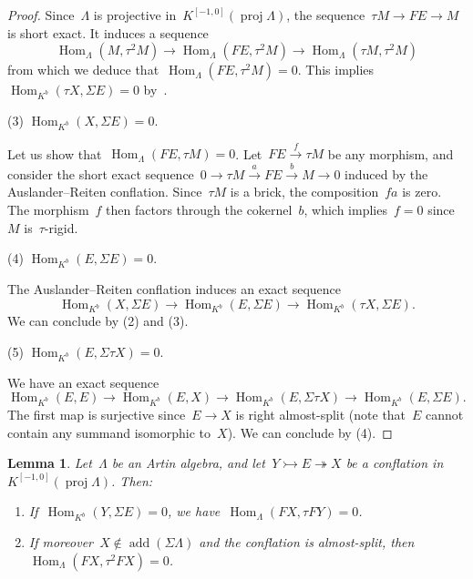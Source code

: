 \documentclass{amsart}
\newtheorem{lemma}[theorem]{Lemma}
\theoremstyle{definition}
\newcommand{\Hom}[1]{\operatorname{Hom}_{#1}}
\newcommand{\susp}{\Sigma}
\newcommand{\add}{\operatorname{add}}
\newcommand{\proj}{\operatorname{proj}}
\newcommand{\infl}{\rightarrowtail}
\newcommand{\defl}{\twoheadrightarrow}
\begin{document}
\begin{proof}
Since~$\Lambda$ is projective in~$K^{[-1,0]}(\proj\Lambda)$, the sequence~$\tau M \to FE \to M$ is short exact.
It induces a sequence
\[
\Hom{\Lambda}(M,\tau^2 M) \to \Hom{\Lambda}(FE,\tau^2 M) \to \Hom{\Lambda}(\tau M,\tau^2 M)
\]
from which we deduce that~$\Hom{\Lambda}(FE,\tau^2 M)=0$.
This implies~$\Hom{K^b}(\tau X,\susp E) = 0$ by~\cite[Lem.~3.4 ]{AdachiIyamaReiten}.

\vspace{7pt}
\noindent (3) $\Hom{K^b}(X,\susp E) = 0$.
\vspace{4pt}

Let us show that~$\Hom{\Lambda}(FE,\tau M)=0$.
Let~$FE \xrightarrow{f} \tau M$ be any morphism, and consider the short exact sequence~$0\to \tau M \xrightarrow{a} FE \xrightarrow{b} M \to 0$ induced by the Auslander--Reiten conflation.
Since~$\tau M$ is a brick, the composition~$fa$ is zero.
The morphism~$f$ then factors through the cokernel~$b$, which implies~$f=0$ since~$M$ is~$\tau$-rigid.

\vspace{7pt}
\noindent (4) $\Hom{K^b}(E,\susp E) = 0$.
\vspace{4pt}

The Auslander--Reiten conflation induces an exact sequence
\[
\Hom{K^b}(X,\susp E) \to \Hom{K^b}(E,\susp E) \to \Hom{K^b}(\tau X,\susp E).
\]
We can conclude by (2) and (3).

\vspace{7pt}
\noindent (5) $\Hom{K^b}(E,\susp \tau X) = 0$.
\vspace{4pt}

We have an exact sequence
\[
\Hom{K^b}(E,E) \to \Hom{K^b}(E,X) \to \Hom{K^b}(E,\susp \tau X) \to \Hom{K^b}(E,\susp E).
\]
The first map is surjective since~$E\to X$ is right almost-split (note that~$E$ cannot contain any summand isomorphic to~$X$).
We can conclude by (4).
\end{proof}

\begin{lemma}
\label{lem:if AR are mutations}
Let~$\Lambda$ be an Artin algebra, and let~$Y\infl E\defl X$ be a conflation in~$K^{[-1,0]}(\proj\Lambda)$. Then:
\begin{enumerate}
\item If~$\Hom{K^b}(Y,\susp E)=0$, we have~$\Hom{\Lambda}(FX,\tau FY)=0$.
\item If moreover~$X\notin\add(\susp\Lambda)$ and the conflation is almost-split, then~$\Hom{\Lambda}(FX,\tau^2 FX)=0$.
\end{enumerate}
\end{lemma}
\end{document}
